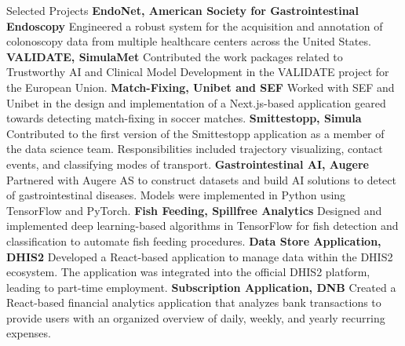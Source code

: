 \begin{rubric}{Selected Projects}
%
\entry*[2023]%
\textbf{EndoNet, American Society for Gastrointestinal Endoscopy} Engineered a robust system for the acquisition and annotation of colonoscopy data from multiple healthcare centers across the United States.
%
\entry*[2023]%
\textbf{VALIDATE, SimulaMet} Contributed the work packages related to Trustworthy AI and Clinical Model Development in the VALIDATE project for the European Union.
%
\entry*[2022]%
\textbf{Match-Fixing, Unibet and SEF} Worked with SEF and Unibet in the design and implementation of a Next.js-based application geared towards detecting match-fixing in soccer matches.
%
\entry*[2020]%
\textbf{Smittestopp, Simula} Contributed to the first version of the Smittestopp application as a member of the data science team. Responsibilities included trajectory visualizing, contact events, and classifying modes of transport.
%
\entry*[2019]
\textbf{Gastrointestinal AI, Augere} Partnered with Augere AS to construct datasets and build AI solutions to detect of gastrointestinal diseases. Models were implemented in Python using TensorFlow and PyTorch.
%
\entry*[2018]%
\textbf{Fish Feeding, Spillfree Analytics} Designed and implemented deep learning-based algorithms in TensorFlow for fish detection and classification to automate fish feeding procedures.
%
\entry*[2017]%
\textbf{Data Store Application, DHIS2} Developed a React-based application to manage data within the DHIS2 ecosystem. The application was integrated into the official DHIS2 platform, leading to part-time employment.
%
\entry*[2017]%
\textbf{Subscription Application, DNB} Created a React-based financial analytics application that analyzes bank transactions to provide users with an organized overview of daily, weekly, and yearly recurring expenses.
\end{rubric}